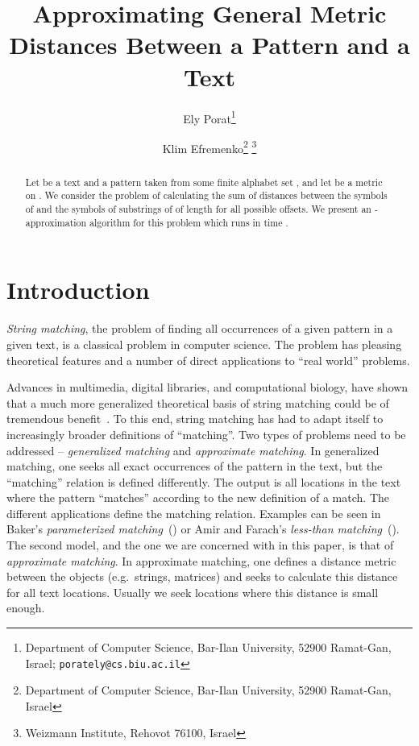 \documentclass[11pt]{article}
\begin{document}
\title{Approximating General Metric Distances Between a Pattern and a Text}






\author{
Ely Porat\thanks{Department of Computer Science, Bar-Ilan
University, 52900 Ramat-Gan, Israel; {\tt porately@cs.biu.ac.il}}
\and Klim Efremenko\thanks{Department of Computer Science, Bar-Ilan
University, 52900 Ramat-Gan, Israel } \thanks{ Weizmann Institute,
Rehovot 76100, Israel}}





\maketitle


\begin{abstract}
Let  be a text and 
a pattern taken from some finite alphabet set , and let
 be a metric on . We consider the problem of
calculating the sum of distances between the symbols of  and
the symbols of substrings of  of length  for all possible
offsets. We present an -approximation algorithm for
this problem which runs in time .










\end{abstract}


\setlength{\parindent}{0.0in} \setlength{\parskip}{0.1 in}
\section{Introduction \label{sec:intro}}
\emph{String matching}, the problem of finding all occurrences of a given
pattern in a given text, is a classical problem in computer
science. The problem has pleasing theoretical features and a
number of direct applications to ``real world'' problems.



 Advances in multimedia, digital libraries, and computational
biology, have shown that a much more generalized theoretical basis
of string matching could be of tremendous
benefit~\cite{Pentland-92,olson:95}.
 To this end, string matching has had to adapt itself to
increasingly broader definitions of ``matching''. Two types of
problems need to be addressed -- {\it generalized matching} and
{\it approximate matching}. In generalized matching, one seeks all
exact occurrences of the pattern in the text, but the ``matching''
relation is defined differently. The output is all locations in
the text where the pattern ``matches'' according to the new
definition of a match. The different applications define the
matching relation. Examples can be seen in Baker's {\it
parameterized matching}~(\cite{bak:93}) or Amir and Farach's {\it
less-than matching}~(\cite{AF-95}). The second model, and the one
we are concerned with in this paper, is that of {\em approximate
matching}. In approximate matching, one defines a distance metric
between the objects (e.g.\ strings, matrices) and seeks to
calculate this distance for all text locations. Usually we seek
locations where this distance is small enough.
\end{document}

